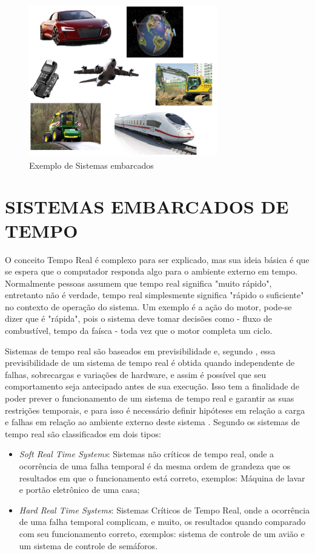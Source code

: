 \begin{figure}[htp]
	\centering
	\includegraphics[scale=1]{images/exemplo_sistemas_embarcados.png}
	\caption{Exemplo de Sistemas embarcados}	
	\label{fig:exemplosistemasembarcados}	
\end{figure}

\section{SISTEMAS EMBARCADOS DE TEMPO}
O conceito Tempo Real é complexo para ser explicado, mas sua ideia básica é que se espera que o computador responda algo para o ambiente externo em tempo. Normalmente pessoas assumem que tempo real significa "muito rápido", entretanto não é verdade, tempo real simplesmente significa "rápido o suficiente" no contexto de operação do sistema. Um exemplo é a ação do motor, pode-se dizer que é "rápida", pois o sistema deve tomar decisões como - fluxo de combustível, tempo da faísca - toda vez que o motor completa um ciclo.

Sistemas de tempo real são baseados em previsibilidade e, segundo \cite{farines2000sistemas}, essa previsibilidade de um sistema de tempo real é obtida quando independente de falhas, sobrecargas e variações de hardware, e assim é possível que seu comportamento seja antecipado antes de sua execução. Isso tem a finalidade de poder prever o funcionamento de um sistema de tempo real e garantir as suas restrições temporais, e para isso é necessário definir hipóteses em relação a carga e falhas em relação ao ambiente externo deste sistema \cite{farines2000sistemas}. 
Segundo \cite{mall2009real} os sistemas de tempo real são classificados em dois tipos:
\begin{itemize}
\item \emph{Soft Real Time Systems}: Sistemas não críticos de tempo real, onde a ocorrência de uma falha temporal é da mesma ordem de grandeza que os resultados em que o funcionamento está correto, exemplos: Máquina de lavar e portão eletrônico de uma casa;
\item \emph{Hard Real Time Systems}: Sistemas Críticos de Tempo Real, onde a ocorrência de uma falha temporal complicam, e muito, os resultados quando comparado com seu funcionamento correto, exemplos: sistema de controle de um avião e um sistema de controle de semáforos.
\end{itemize}

